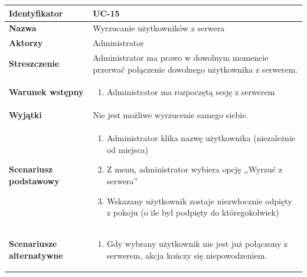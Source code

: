 \documentclass[11pt,oneside,a4paper,titlepage,onecolumn]{article}
\newenvironment{enumreq}
{ \begin{enumerate}[topsep=0pt,itemsep=-1ex,partopsep=1ex,parsep=1ex] }
{ \end{enumerate}                  }
\begin{document}
{\vspace{2em}

\begin{tabular}{ | l | l | }
	\hline
		\textbf{Identyfikator} & 
		UC-15
		\\
		
	\hline
		\textbf{Nazwa} & 
		Wyrzucanie użytkowników z serwera
		\\
		
	\hline
		\textbf{Aktorzy} & \parbox[t]{11cm}{
			Administrator
		}\\
		 
	\hline
		\parbox[t]{4cm}{\textbf{Streszczenie}} & \parbox[t]{11cm}{
			Administrator ma prawo w dowolnym momencie przerwać
			połączenie dowolnego użytkownika z serwerem.
			
		}\\
		
	\hline
		\parbox[t]{4cm}{\textbf{Warunek wstępny}} & \parbox[t]{11cm}{
			\begin{enumreq}
				\item Administrator ma rozpoczętą sesję z serwerem
			\end{enumreq}
				
		}
		\\
		
	\hline
		\parbox[t]{4cm}{\textbf{Wyjątki}} & \parbox[t]{11cm}{
			Nie jest możliwe wyrzucenie samego siebie.
			
		}
		\\

	\hline
		\parbox[t]{4cm}{\textbf{Scenariusz podstawowy}} & \parbox[t]{11cm}{
			\begin{enumreq}
				\item Administrator klika nazwę użytkownika (niezależnie
				od miejsca)
				\item Z menu, administrator wybiera opcję ,,Wyrzuć z 
				serwera''
				\item Wskazany użytkownik zostaje niezwłocznie odpięty z 
				pokoju (o ile był podpięty do któregokolwiek)
			\end{enumreq}
		}
		\\
		
	\hline
		\parbox[t]{4cm}{\textbf{Scenariusze alternatywne}} & \parbox[t]
		{11cm}{
			\begin{enumreq}
				\item Gdy wybrany użytkownik nie jest już połączony z
				serwerem, akcja kończy się niepowodzeniem.
			\end{enumreq}
		}
		\\
		

\end{tabular}}
\end{document}
